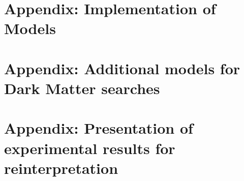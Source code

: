 \documentclass[a4paper,debug,notitlepage,nobib]{tufte-book}
\begin{document}
\chapter{Appendix: Implementation of Models}
\label{app:MonojetLikeModels_Appendix}


\chapter{Appendix: Additional models for Dark Matter searches}
\label{app:EWSpecificModels_Appendix}


\chapter{Appendix: Presentation of experimental results for reinterpretation}
\label{app:Presentation_Of_Experimental_Results}


% 

%

\end{document}
